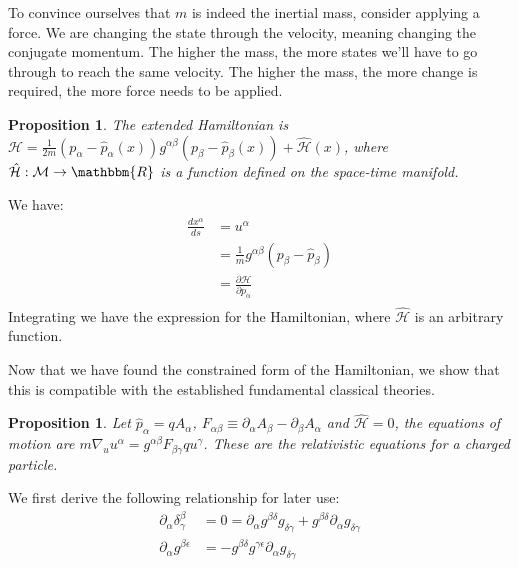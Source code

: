 \documentclass[aps,pra,10pt,twocolumn,floatfix,nofootinbib]{revtex4-1}
\newtheorem{prop}[thm]{Proposition}
\theoremstyle{definition}
\begin{document}
To convince ourselves that $m$ is indeed the inertial mass, consider applying a force. We are changing the state through the velocity, meaning changing the conjugate momentum. The higher the mass, the more states we'll have to go through to reach the same velocity. The higher the mass, the more change is required, the more force needs to be applied.

\begin{prop}\label{kineticHamiltonian}
The extended Hamiltonian is $\mathcal{H}=\frac{1}{2m}(p_\alpha-\hat{p}_\alpha(x))g^{\alpha\beta}(p_\beta-\hat{p}_\beta(x))+\hat{\mathcal{H}}(x)$, where $\hat{\mathcal{H}} : \mathcal{M} \rightarrow \mathbbm{R}$ is a function defined on the space-time manifold.
\end{prop}
We have:
\begin{align*}
\frac{dx^\alpha}{ds} &= u^\alpha \\
&= \frac{1}{m}g^{\alpha\beta}(p_\beta-\hat{p}_\beta) \\
&= \frac{\partial \mathcal{H}}{\partial p_\alpha} \\
\end{align*}
Integrating we have the expression for the Hamiltonian, where $\hat{\mathcal{H}}$ is an arbitrary function.

Now that we have found the constrained form of the Hamiltonian, we show that this is compatible with the established fundamental classical theories.

\begin{prop}\label{relativisticEM}
Let $\hat{p}_\alpha = q A_\alpha$, $F_{\alpha \beta} \equiv \partial_\alpha A_\beta - \partial_\beta A_\alpha$ and $\hat{\mathcal{H}} = 0$, the equations of motion are $m \nabla_u u^\alpha = g^{\alpha\beta} F_{\beta \gamma} q u^\gamma$. These are the relativistic equations for a charged particle.
\end{prop}

We first derive the following relationship for later use:
\begin{align*}
\partial_\alpha \delta^\beta_\gamma &= 0 = \partial_\alpha g^{\beta\delta} g_{\delta\gamma} + g^{\beta\delta} \partial_\alpha g_{\delta\gamma}\\
\partial_\alpha g^{\beta\epsilon} &= - g^{\beta\delta} g^{\gamma\epsilon} \partial_\alpha g_{\delta\gamma}
\end{align*}
\end{document}
